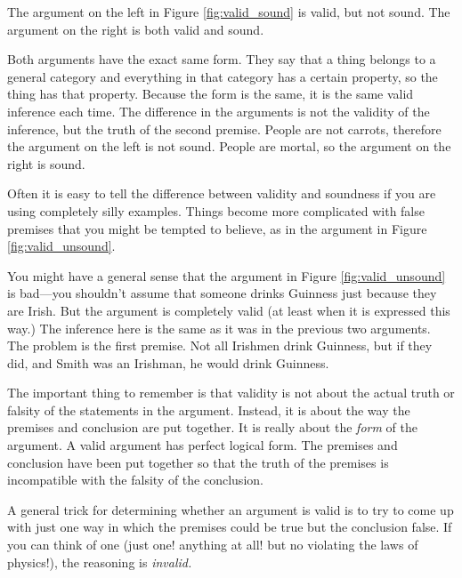 The argument on the left in Figure \ref{fig:valid_sound} is valid, but not sound. The argument on the right is both valid and sound.

Both arguments have the exact same form. They say that a thing belongs to a general category and everything in that category has a certain property, so the thing has that property. Because the form is the same, it is the same valid inference each time. The difference in the arguments is not the validity of the inference, but the truth of the second premise. People are not carrots, therefore the argument on the left is not sound. People are mortal, so the argument on the right is sound.

Often it is easy to tell the difference between validity and soundness if you are using completely silly examples. Things become more complicated with false premises that you might be tempted to believe, as in the argument in Figure \ref{fig:valid_unsound}.

\begin{kormanize}
\end{kormanize}


You might have a general sense that the argument in Figure \ref{fig:valid_unsound} is bad---you shouldn't assume that someone drinks Guinness just because they are Irish. But the argument is completely valid (at least when it is expressed this way.) The inference here is the same as it was in the previous two arguments. The problem is the first premise. Not all Irishmen drink Guinness, but if they did, and Smith was an Irishman, he would drink Guinness.

The important thing to remember is that validity is not about the actual truth or falsity of the statements in the argument. Instead, it is about the way the premises and conclusion are put together. It is really about the \emph{form} of the argument. A valid argument has perfect logical form. The premises and conclusion have been put together so that the truth of the premises is incompatible with the falsity of the conclusion.

A general trick for determining whether an argument is valid is to try to come up with just one way in which the premises could be true but the conclusion false. If you can think of one (just one! anything at all! but no violating the laws of physics!), the reasoning is \textit {invalid.}

